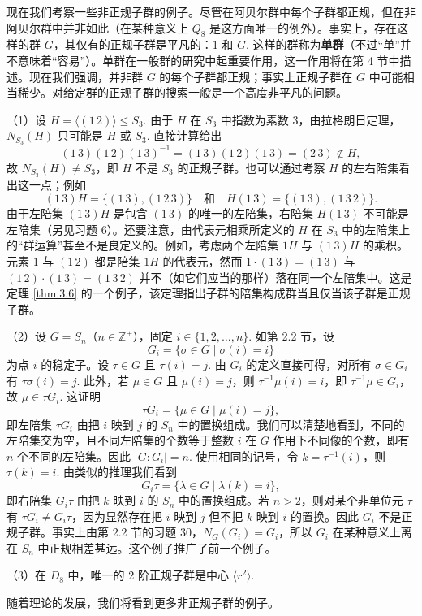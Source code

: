 现在我们考察一些非正规子群的例子。尽管在阿贝尔群中每个子群都正规，但在非阿贝尔群中并非如此（在某种意义上 \(Q_8\) 是这方面唯一的例外）。事实上，存在这样的群 \(G\)，其仅有的正规子群是平凡的：\(1\) 和 \(G\). 这样的群称为\textbf{单群}（不过“单”并不意味着“容易”）。单群在一般群的研究中起重要作用，这一作用将在第 4 节中描述。现在我们强调，并非群 \(G\) 的每个子群都正规；事实上正规子群在 \(G\) 中可能相当稀少。对给定群的正规子群的搜索一般是一个高度非平凡的问题。

\begin{example}
（1）设 \(H = \langle (1\,2) \rangle \leq S_3\). 由于 \(H\) 在 \(S_3\) 中指数为素数 3，由拉格朗日定理，\(N_{S_3}(H)\) 只可能是 \(H\) 或 \(S_3\). 直接计算给出
\[
(1\,3)(1\,2)(1\,3)^{-1} = (1\,3)(1\,2)(1\,3) = (2\,3) \notin H,
\]
故 \(N_{S_3}(H) \neq S_3\)，即 \(H\) 不是 \(S_3\) 的正规子群。也可以通过考察 \(H\) 的左右陪集看出这一点；例如
\[
(1\,3)H = \{(1\,3), (1\,2\,3)\} \quad \text{和} \quad H(1\,3) = \{(1\,3), (1\,3\,2)\}.
\]
由于左陪集 \((1\,3)H\) 是包含 \((1\,3)\) 的唯一的左陪集，右陪集 \(H(1\,3)\) 不可能是左陪集（另见习题 6）。还要注意，由代表元相乘所定义的 \(H\) 在 \(S_3\) 中的左陪集上的“群运算”甚至不是良定义的。例如，考虑两个左陪集 \(1H\) 与 \((1\,3)H\) 的乘积。元素 \(1\) 与 \((1\,2)\) 都是陪集 \(1H\) 的代表元，然而 \(1 \cdot (1\,3) = (1\,3)\) 与 \((1\,2) \cdot (1\,3) = (1\,3\,2)\) 并不（如它们应当的那样）落在同一个左陪集中。这是定理 \ref{thm:3.6} 的一个例子，该定理指出子群的陪集构成群当且仅当该子群是正规子群。

（2）设 \(G = S_n\)（\(n \in \mathbb{Z}^+\)），固定 \(i \in \{1, 2, \ldots, n\}\). 如第 2.2 节，设
\[
G_i = \{\sigma \in G \mid \sigma(i) = i\}
\]
为点 \(i\) 的稳定子。设 \(\tau \in G\) 且 \(\tau(i) = j\). 由 \(G_i\) 的定义直接可得，对所有 \(\sigma \in G_i\) 有 \(\tau\sigma(i) = j\). 此外，若 \(\mu \in G\) 且 \(\mu(i) = j\)，则 \(\tau^{-1}\mu(i) = i\)，即 \(\tau^{-1}\mu \in G_i\)，故 \(\mu \in \tau G_i\). 这证明
\[
\tau G_i = \{\mu \in G \mid \mu(i) = j\},
\]
即左陪集 \(\tau G_i\) 由把 \(i\) 映到 \(j\) 的 \(S_n\) 中的置换组成。我们可以清楚地看到，不同的左陪集交为空，且不同左陪集的个数等于整数 \(i\) 在 \(G\) 作用下不同像的个数，即有 \(n\) 个不同的左陪集。因此 \(|G : G_i| = n\). 使用相同的记号，令 \(k = \tau^{-1}(i)\)，则 \(\tau(k) = i\). 由类似的推理我们看到
\[
G_i \tau = \{\lambda \in G \mid \lambda(k) = i\},
\]
即右陪集 \(G_i \tau\) 由把 \(k\) 映到 \(i\) 的 \(S_n\) 中的置换组成。若 \(n > 2\)，则对某个非单位元 \(\tau\) 有 \(\tau G_i \neq G_i \tau\)，因为显然存在把 \(i\) 映到 \(j\) 但不把 \(k\) 映到 \(i\) 的置换。因此 \(G_i\) 不是正规子群。事实上由第 2.2 节的习题 30，\(N_G(G_i) = G_i\)，所以 \(G_i\) 在某种意义上离在 \(S_n\) 中正规相差甚远。这个例子推广了前一个例子。

（3）在 \(D_8\) 中，唯一的 2 阶正规子群是中心 \(\langle r^2 \rangle\).

随着理论的发展，我们将看到更多非正规子群的例子。
\end{example}

